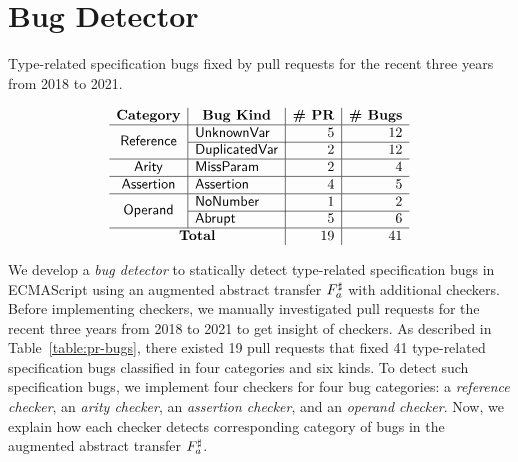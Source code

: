 \section{Bug Detector}\label{sec:checker}

\begin{table}
  \centering
  \caption{Type-related specification bugs fixed by pull requests for the recent
  three years from 2018 to 2021.}
  \label{table:pr-bugs}
  \vspace*{-1.5em}
  \[
    \begin{array}{c|l|r|r}
      \multicolumn{1}{c|}{\textbf{Category}} &
      \multicolumn{1}{c|}{\textbf{Bug Kind}} &
      \multicolumn{1}{c|}{\textbf{\# PR}} &
      \multicolumn{1}{c}{\textbf{\# Bugs}}\\
      \hline

      \multirow{2}{*}{\stextsf{Reference}}
      & \stextsf{UnknownVar} & 5 & 12\\\cline{2-4}
      & \stextsf{DuplicatedVar} & 2 & 12\\\hline

      \multirow{1}{*}{\stextsf{Arity}}
      & \stextsf{MissParam} & 2 & 4\\\hline

      \multirow{1}{*}{\stextsf{Assertion}}
      & \stextsf{Assertion} & 4 & 5\\\hline

      \multirow{2}{*}{\stextsf{Operand}}
      & \stextsf{NoNumber} & 1 & 2\\\cline{2-4}
      & \stextsf{Abrupt} & 5 & 6\\\hline

      \multicolumn{2}{c|}{\textbf{Total}} & 19 & 41\\

    \end{array}
  \]
  \vspace*{-1.5em}
\end{table}

We develop a \textit{bug detector} to statically detect type-related
specification bugs in ECMAScript using an augmented abstract transfer
${F}^\sharp_a$ with additional checkers.  Before implementing checkers, we manually
investigated pull requests for the recent three years from 2018 to 2021 to get
insight of checkers.  As described in Table~\ref{table:pr-bugs}, there existed
19 pull requests that fixed 41 type-related specification bugs classified in
four categories and six kinds.  To detect such specification bugs, we implement
four checkers for four bug categories: a \textit{reference checker}, an
\textit{arity checker}, an \textit{assertion checker}, and an \textit{operand
checker}.  Now, we explain how each checker detects corresponding category of
bugs in the augmented abstract transfer ${F}^\sharp_a$.


